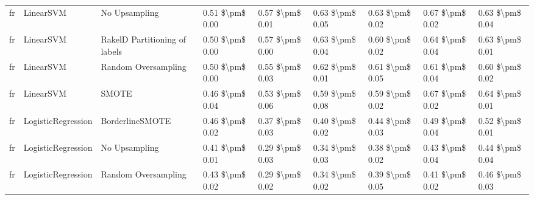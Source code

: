 \begin{tabular}{lllllllll}
      fr &                       LinearSVM &                 No Upsampling &     0.51 \$\textbackslash pm\$ 0.00 &           0.57 \$\textbackslash pm\$ 0.01 &       0.63 \$\textbackslash pm\$ 0.05 &        0.63 \$\textbackslash pm\$ 0.02 &                         0.67 \$\textbackslash pm\$ 0.02 &     0.63 \$\textbackslash pm\$ 0.04 \\
      fr &                       LinearSVM & RakelD Partitioning of labels &     0.50 \$\textbackslash pm\$ 0.00 &           0.57 \$\textbackslash pm\$ 0.00 &       0.63 \$\textbackslash pm\$ 0.04 &        0.60 \$\textbackslash pm\$ 0.02 &                         0.64 \$\textbackslash pm\$ 0.04 &     0.63 \$\textbackslash pm\$ 0.01 \\
      fr &                       LinearSVM &           Random Oversampling &     0.50 \$\textbackslash pm\$ 0.00 &           0.55 \$\textbackslash pm\$ 0.03 &       0.62 \$\textbackslash pm\$ 0.01 &        0.61 \$\textbackslash pm\$ 0.05 &                         0.61 \$\textbackslash pm\$ 0.04 &     0.60 \$\textbackslash pm\$ 0.02 \\
      fr &                       LinearSVM &                         SMOTE &     0.46 \$\textbackslash pm\$ 0.04 &           0.53 \$\textbackslash pm\$ 0.06 &       0.59 \$\textbackslash pm\$ 0.08 &        0.59 \$\textbackslash pm\$ 0.02 &                         0.67 \$\textbackslash pm\$ 0.02 &     0.64 \$\textbackslash pm\$ 0.01 \\
      fr &              LogisticRegression &               BorderlineSMOTE &     0.46 \$\textbackslash pm\$ 0.02 &           0.37 \$\textbackslash pm\$ 0.03 &       0.40 \$\textbackslash pm\$ 0.02 &        0.44 \$\textbackslash pm\$ 0.03 &                         0.49 \$\textbackslash pm\$ 0.04 &     0.52 \$\textbackslash pm\$ 0.01 \\
      fr &              LogisticRegression &                 No Upsampling &     0.41 \$\textbackslash pm\$ 0.01 &           0.29 \$\textbackslash pm\$ 0.03 &       0.34 \$\textbackslash pm\$ 0.03 &        0.38 \$\textbackslash pm\$ 0.02 &                         0.43 \$\textbackslash pm\$ 0.04 &     0.44 \$\textbackslash pm\$ 0.04 \\
      fr &              LogisticRegression &           Random Oversampling &     0.43 \$\textbackslash pm\$ 0.02 &           0.29 \$\textbackslash pm\$ 0.02 &       0.34 \$\textbackslash pm\$ 0.02 &        0.39 \$\textbackslash pm\$ 0.05 &                         0.41 \$\textbackslash pm\$ 0.02 &     0.46 \$\textbackslash pm\$ 0.03 \\

\end{tabular}

